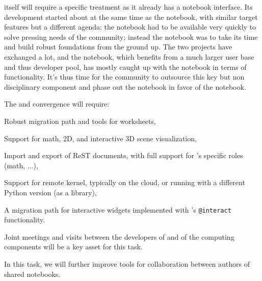 \begin{workpackage}
\begin{tasklist}
\begin{task}[title=Uniform notebook interface for all interactive components,id=ipython-kernels]

  \Sage itself will require a specific treatment as it already has a
  notebook interface. Its development started about at the same time
  as the \Jupyter notebook, with similar target features but a
  different agenda: the \Sage notebook had to be available very quickly
  to solve pressing needs of the \Sage community; instead the \Jupyter
  notebook was to take its time and build robust foundations from the
  ground up. The two projects have exchanged a lot, and the \Jupyter
  notebook, which benefits from a much larger user base and thus
  developer pool, has mostly caught up with the \Sage notebook in terms
  of functionality. It's thus time for the \Sage community to outsource
  this key but non disciplinary component and phase out the \Sage
  notebook in favor of the \Jupyter notebook.

  The \Sage and \Jupyter convergence  will
  require:
  \begin{compactitem}
  \item Robust migration path and tools for \Sage worksheets,
  \item Support for math, 2D, and interactive 3D scene visualization,
  \item Import and export of ReST documents, with full support for
    \Sage's specific roles (math, ...),
  \item Support for remote \Sage kernel, typically on the cloud, or
    running with a different Python version (\Sage as a library),
  \item A migration path for interactive widgets implemented with
    \Sage's \texttt{@interact} functionality.
  \end{compactitem}

  Joint meetings and visits between the developers of \Jupyter and of
  the computing components will be a key asset for this task.

\end{task}

\begin{task}[id=notebook-collab,title=Notebook improvements for collaboration]
  In this task, we will further improve tools for collaboration between
  authors of shared \Jupyter notebooks.
  

\end{task}
\end{tasklist}
\end{workpackage}
